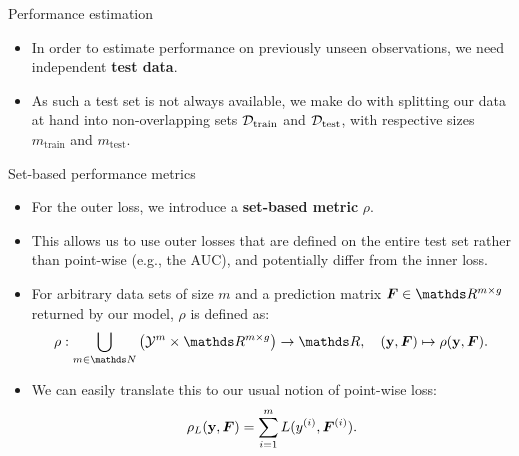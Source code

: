 \documentclass[11pt,compress,t,notes=noshow, xcolor=table]{beamer}
\begin{document}
\begin{vbframe}{Performance estimation}
\begin{itemize}
  \item In order to estimate performance on previously unseen observations, we 
  need independent \textbf{test data}. 
  \item As such a test set is not always available, we make do with 
  splitting our data at hand into non-overlapping sets $\mathcal{D}_{\text{train}}$ and $\mathcal{D}_{\text{test}}$, 
  with respective sizes $m_{\mathrm{train}}$ and $m_{\mathrm{test}}$.
\end{itemize}

\end{vbframe}


\begin{vbframe}{Set-based performance metrics}

\begin{itemize}
  \item For the outer loss, we introduce a \textbf{set-based metric} $\rho$.
  \item This allows us to use outer losses that are defined on the entire test 
  set rather than point-wise (e.g., the AUC), and potentially differ from the 
  inner loss.
  \item For arbitrary data sets of size $m$ and a prediction matrix 
  $\bm{F} \in \R^{m \times g}$ returned by our model, $\rho$ is defined as:
  $$\rho: \bigcup_{m \in \N} \left( \Yspace^m \times \R^{m \times g} \right) 
  \rightarrow \R, \quad (\yv, \bm{F}) \mapsto \rho(\yv, \bm{F}).$$
  \item We can easily translate this to our usual notion of point-wise loss:
  $$\rho_L(\mathbf{y}, \bm{F}) = \sum_{i=1}^m L(y^{(i)}, \bm{F}^{(i)}).$$
\end{itemize}

\end{vbframe}

\end{document}
